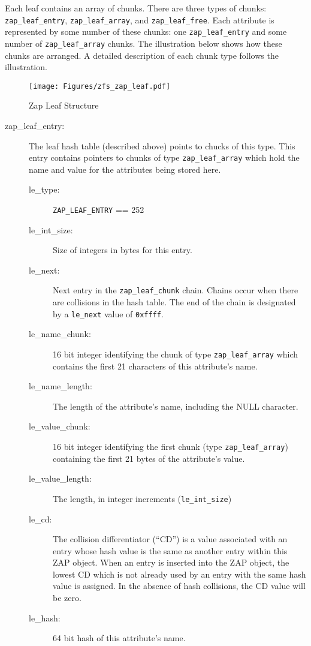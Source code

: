 Each leaf contains an array of chunks.
There are three types of chunks:
\lstinline{zap_leaf_entry}, \lstinline{zap_leaf_array}, and \lstinline{zap_leaf_free}.
Each attribute is represented by some number of these chunks:
one \lstinline{zap_leaf_entry} and some number of \lstinline{zap_leaf_array} chunks.
The illustration below shows
how these chunks are arranged.
A detailed description of each chunk type follows the illustration.

\begin{figure}[ht]
  \centering
  \texttt{[image: Figures/zfs\_zap\_leaf.pdf]}
  \caption{Zap Leaf Structure}
  \label{fig:zap_leaf}
\end{figure}

\begin{description}
\item[zap\_leaf\_entry:]
  The leaf hash table (described above) points to chucks of this type.
  This entry contains pointers to chunks of type \lstinline{zap_leaf_array}
  which hold the name and value for the attributes being stored here.
  \begin{description}
  \item[le\_type:]
    \lstinline{ZAP_LEAF_ENTRY} == 252
  \item[le\_int\_size:]
    Size of integers in bytes for this entry.
  \item[le\_next:]
    Next entry in the \lstinline{zap_leaf_chunk} chain.
    Chains occur when there are collisions in the hash table.
    The end of the chain is designated by a \lstinline{le_next} value of \lstinline{0xffff}.
  \item[le\_name\_chunk:] 16 bit integer identifying the chunk of type \lstinline{zap_leaf_array}
    which contains the first 21 characters of this attribute's name.
  \item[le\_name\_length:]
    The length of the attribute's name, including the NULL character.
  \item[le\_value\_chunk:]
    16 bit integer identifying the first chunk
    (type \lstinline{zap_leaf_array}) containing the first 21 bytes of the attribute's value.
  \item[le\_value\_length:]
    The length, in integer increments (\lstinline{le_int_size})
  \item[le\_cd:]
    The collision differentiator (``CD'') is a value
    associated with an entry
    whose hash value is the same as another entry within this ZAP object.
    When an entry is inserted into the ZAP object,
    the lowest CD which is not already used by an entry with the same hash value is assigned.
    In the absence of hash collisions, the CD value will be zero.
  \item[le\_hash:]
    64 bit hash of this attribute's name.
  \end{description}


\end{description}
